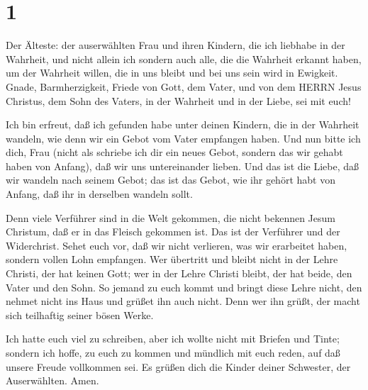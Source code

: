 \hypertarget{section}{%
\section{1}\label{section}}

 Der Älteste: der auserwählten Frau und ihren Kindern, die
ich liebhabe in der Wahrheit, und nicht allein ich sondern auch alle,
die die Wahrheit erkannt haben,  um der Wahrheit willen, die
in uns bleibt und bei uns sein wird in Ewigkeit.  Gnade,
Barmherzigkeit, Friede von Gott, dem Vater, und von dem HERRN Jesus
Christus, dem Sohn des Vaters, in der Wahrheit und in der Liebe, sei mit
euch!

 Ich bin erfreut, daß ich gefunden habe unter deinen
Kindern, die in der Wahrheit wandeln, wie denn wir ein Gebot vom Vater
empfangen haben.  Und nun bitte ich dich, Frau (nicht als
schriebe ich dir ein neues Gebot, sondern das wir gehabt haben von
Anfang), daß wir uns untereinander lieben.  Und das ist die
Liebe, daß wir wandeln nach seinem Gebot; das ist das Gebot, wie ihr
gehört habt von Anfang, daß ihr in derselben wandeln sollt.

 Denn viele Verführer sind in die Welt gekommen, die nicht
bekennen Jesum Christum, daß er in das Fleisch gekommen ist. Das ist der
Verführer und der Widerchrist.  Sehet euch vor, daß wir
nicht verlieren, was wir erarbeitet haben, sondern vollen Lohn
empfangen.  Wer übertritt und bleibt nicht in der Lehre
Christi, der hat keinen Gott; wer in der Lehre Christi bleibt, der hat
beide, den Vater und den Sohn.  So jemand zu euch kommt und
bringt diese Lehre nicht, den nehmet nicht ins Haus und grüßet ihn auch
nicht.  Denn wer ihn grüßt, der macht sich teilhaftig
seiner bösen Werke.

 Ich hatte euch viel zu schreiben, aber ich wollte nicht
mit Briefen und Tinte; sondern ich hoffe, zu euch zu kommen und mündlich
mit euch reden, auf daß unsere Freude vollkommen sei.  Es
grüßen dich die Kinder deiner Schwester, der Auserwählten. Amen.
